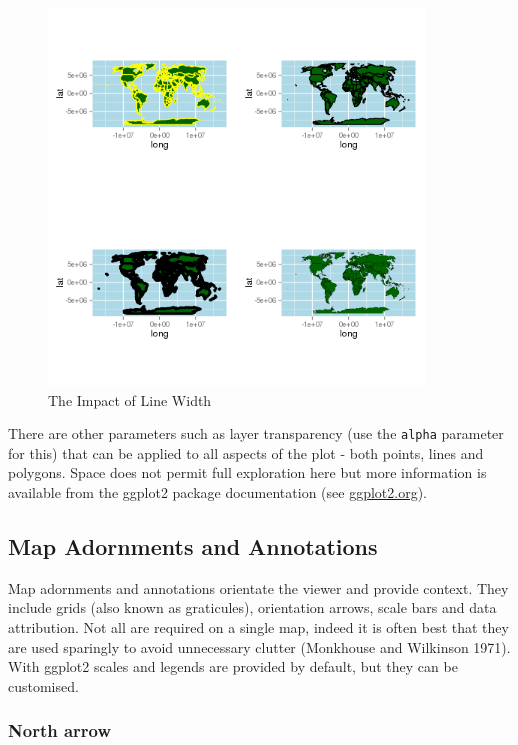 \documentclass[]{article}
\let\Oldincludegraphics\includegraphics
\renewcommand{\includegraphics}[1]{\Oldincludegraphics[width=10cm]{#1}}
\begin{document}
\begin{figure}[htbp]
\centering
\includegraphics{figure/The_Impact_of_Line_Width.png}
\caption{The Impact of Line Width}
\end{figure}

There are other parameters such as layer transparency (use the
\texttt{alpha} parameter for this) that can be applied to all aspects of
the plot - both points, lines and polygons. Space does not permit full
exploration here but more information is available from the ggplot2
package documentation (see \href{http://ggplot2.org/}{ggplot2.org}).

\subsection{Map Adornments and Annotations}

Map adornments and annotations orientate the viewer and provide context.
They include grids (also known as graticules), orientation arrows, scale
bars and data attribution. Not all are required on a single map, indeed
it is often best that they are used sparingly to avoid unnecessary
clutter (Monkhouse and Wilkinson 1971). With ggplot2 scales and legends
are provided by default, but they can be customised.

\subsubsection{North arrow}
\end{document}

